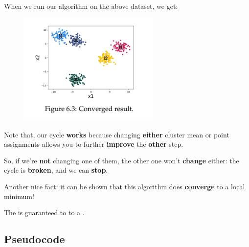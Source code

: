         When we run our algorithm on the above dataset, we get:
        
        \begin{figure}[H]
            \centering
            \includegraphics[width=70mm,scale=0.4]{images/clustering_images/converged_result_clustering.png}
        \end{figure}
        
        Note that, our cycle \textbf{works} because changing \textbf{either} cluster mean or point assignments allows you to further \textbf{improve} the \textbf{other} step.
        
        So, if we're \textbf{not} changing one of them, the other one won't \textbf{change} either: the cycle is \textbf{broken}, and we can \textbf{stop}. 
        
        Another nice fact: it can be shown that this algorithm does \textbf{converge} to a local minimum!\\
        
        \begin{concept}
            The  is guaranteed to  to a .
        \end{concept}
        
    \subsection{Pseudocode}
    
